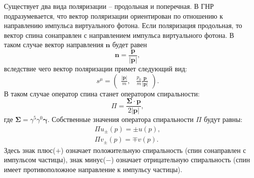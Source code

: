 \documentclass{extreport}
\begin{document}
Существует два вида поляризации -- продольная и поперечная. В ГНР подразумевается, что вектор поляризации ориентирован по отношению к направлению импульса виртуального фотона. Если поляризация продольная, то вектор спина сонаправлен с направлением импульса виртуального фотона. В таком случае вектор направления $\boldsymbol{n}$ будет равен
\begin{equation}
	\boldsymbol{n} = \frac{\boldsymbol{p}}{|\boldsymbol{p}|},
\end{equation}
вследствие чего вектор поляризации примет следующий вид:
\begin{equation}
	s^\mu = \begin{pmatrix}
		\frac{|\boldsymbol{p}|}{m}, & \frac{p_0}{m} \frac{\boldsymbol{p}}{|\boldsymbol{p}|}
	\end{pmatrix}.
\end{equation}
В таком случае оператор спина станет оператором спиральности:
\begin{equation}
	\Pi = \frac{\boldsymbol{\Sigma} \cdot \boldsymbol{p}}{2 |\boldsymbol{p}|},
\end{equation}
где $\boldsymbol{\Sigma} = \gamma^5 \gamma^0 \boldsymbol{\gamma}$. Собственные значения оператора спиральности $\Pi$ будут равны:
\begin{equation}
	\begin{split}
		\Pi u_{\pm}(p) = \pm u(p), \\
		\Pi v_{\pm}(p) = \mp v(p).
	\end{split}	
\end{equation}
Здесь знак плюс($+$) означает положительную спиральность (спин сонаправлен с импульсом частицы), знак минус($-$) означает отрицательную спиральность (спин имеет противоположное направление к импульсу частицы). 
\end{document}
